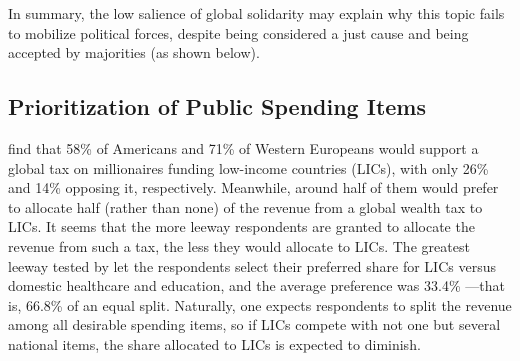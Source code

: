 \documentclass[12pt,english]{article}
\begin{document}
In summary, the low salience of global solidarity may explain why this topic fails to mobilize political forces, despite being considered a just cause and being accepted by majorities (as shown below). 

\subsection{Prioritization of Public Spending Items}\label{subsec:revenue_split}

\cite{fabre_majority_2025} find that 58\% of Americans and 71\% of Western Europeans would support a global tax on millionaires funding low-income countries (LICs), with only 26\% and 14\% opposing it, respectively. Meanwhile, around half of them would prefer to allocate half (rather than none) of the revenue from a global wealth tax to LICs.  
It seems that the more leeway respondents are granted to allocate the revenue from such a tax, the less they would allocate to LICs. 
The greatest leeway tested by \cite{fabre_majority_2025} let the respondents select their preferred share for LICs versus domestic healthcare and education, %
and the average preference was 33.4\% ---that is, 66.8\% of an equal split. %
Naturally, one expects respondents to split the revenue among all desirable spending items, so %
if LICs compete with not one but several national items, the share allocated to LICs is expected to diminish. 
\end{document}
